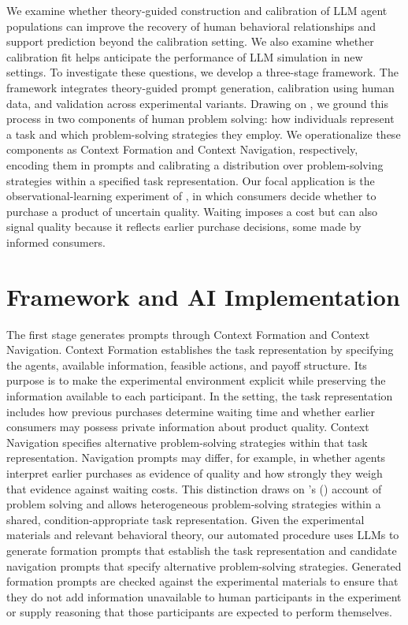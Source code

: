 \documentclass[12pt,letterpaper]{article}
\begin{document}
We examine whether theory-guided construction and calibration of LLM agent populations can improve the recovery of human behavioral relationships and support prediction beyond the calibration setting. We also examine whether calibration fit helps anticipate the performance of LLM simulation in new settings. To investigate these questions, we develop a three-stage framework.  The framework integrates theory-guided prompt generation, calibration using human data, and validation across experimental variants. Drawing on \citet{simon1971}, we ground this process in two components of human problem solving: how individuals represent a task and which problem-solving strategies they employ. We operationalize these components as Context Formation and Context Navigation, respectively, encoding them in prompts and calibrating a distribution over problem-solving strategies within a specified task representation. Our focal application is the observational-learning experiment of \citet{kremer2016}, in which consumers decide whether to purchase a product of uncertain quality. Waiting imposes a cost but can also signal quality because it reflects earlier purchase decisions, some made by informed consumers.

\section*{\normalsize Framework and AI Implementation}
The first stage generates prompts through Context Formation and Context Navigation. Context Formation establishes the task representation by specifying the agents, available information, feasible actions, and payoff structure. Its purpose is to make the experimental environment explicit while preserving the information available to each participant. In the \citet{kremer2016} setting, the task representation includes how previous purchases determine waiting time and whether earlier consumers may possess private information about product quality. Context Navigation specifies alternative problem-solving strategies within that task representation. Navigation prompts may differ, for example, in whether agents interpret earlier purchases as evidence of quality and how strongly they weigh that evidence against waiting costs. This distinction draws on \citeauthor{simon1971}'s (\citeyear{simon1971}) account of problem solving and allows heterogeneous problem-solving strategies within a shared, condition-appropriate task representation. Given the experimental materials and relevant behavioral theory, our automated procedure uses LLMs to generate formation prompts that establish the task representation and candidate navigation prompts that specify alternative problem-solving strategies. Generated formation prompts are checked against the experimental materials to ensure that they do not add information unavailable to human participants in the experiment or supply reasoning that those participants are expected to perform themselves.
\end{document}
